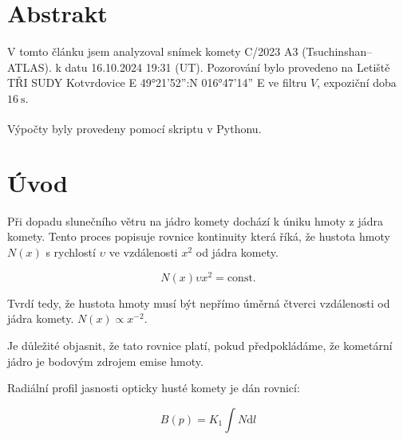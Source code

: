 \documentclass[a4paper,11pt,twocolumn]{article}
\begin{document}

    \vskip10pt
    \section{Abstrakt}
        V tomto článku jsem analyzoval snímek komety C/2023 A3 (Tsuchinshan–ATLAS). k datu 16.10.2024 19:31 (UT). Pozorování bylo provedeno na Letiště TŘI SUDY Kotvrdovice E 49°21'52'':N 016°47'14'' E ve filtru $V$, expoziční doba $\qty{16}{\second}$.
        
        Výpočty byly provedeny pomocí skriptu v Pythonu\textsuperscript{\cite{github}}.
    \section{Úvod}
        Při dopadu slunečního větru na jádro komety dochází k úniku hmoty z jádra komety. Tento proces popisuje rovnice kontinuity která říká, že hustota hmoty $N(x)$ s rychlostí $\upsilon$ ve vzdálenosti $x^2$ od jádra komety.

        \begin{equation}
            N(x) \upsilon x^2 = \text{const.}
        \end{equation}

        Tvrdí tedy, že hustota hmoty musí být nepřímo úměrná čtverci vzdálenosti od jádra komety. $N(x) \propto  x^{-2}$.
        
        Je důležité objasnit, že tato rovnice platí, pokud předpokládáme, že kometární jádro je bodovým zdrojem emise hmoty.
        
        Radiální profil jasnosti opticky husté komety je dán rovnicí:

        \begin{equation}
            B(p) = K_1 \int N \text{d} l
        \end{equation}
\end{document}
